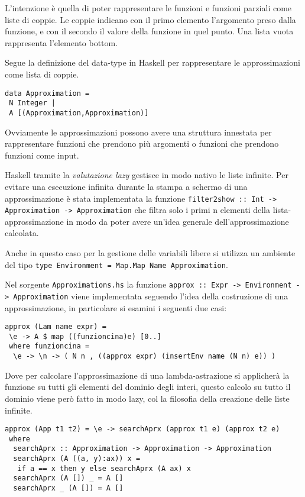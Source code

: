 \documentclass{article}
\begin{document}
L'intenzione è quella di poter rappresentare le funzioni e funzioni parziali come liste di coppie. Le coppie indicano con il primo elemento l'argomento preso dalla funzione, e con il secondo il valore della funzione in quel punto. Una lista vuota rappresenta l'elemento bottom.

Segue la definizione del data-type in Haskell per rappresentare le approssimazioni come lista di coppie.

\begin{verbatim}
data Approximation = 
 N Integer |
 A [(Approximation,Approximation)]
\end{verbatim}

Ovviamente le approssimazioni possono avere una struttura innestata per rappresentare funzioni che prendono più argomenti o funzioni che prendono funzioni come input.

Haskell tramite la \emph{valutazione lazy} gestisce in modo nativo le liste infinite.
Per evitare una esecuzione infinita durante la stampa a schermo di una approssimazione è stata implementata la funzione \texttt{filter2show :: Int -> Approximation -> Approximation} che filtra solo i primi n elementi della lista-approssimazione in modo da poter avere un'idea generale dell'approssimazione calcolata.

Anche in questo caso per la gestione delle variabili libere si utilizza un ambiente del tipo \texttt{type Environment = Map.Map Name Approximation}.

Nel sorgente \texttt{Approximations.hs} la funzione \texttt{approx :: Expr -> Environment -> Approximation} viene implementata seguendo l'idea della costruzione di una approssimazione, in particolare si esamini i seguenti due casi:

\begin{verbatim}
approx (Lam name expr) = 
 \e -> A $ map ((funzioncina)e) [0..]
 where funzioncina = 
  \e -> \n -> ( N n , ((approx expr) (insertEnv name (N n) e)) )
\end{verbatim}

Dove per calcolare l'approssimazione di una lambda-astrazione si applicherà la funzione su tutti gli elementi del dominio degli interi, questo calcolo su tutto il dominio viene però fatto in modo lazy, col la filosofia della creazione delle liste infinite.

\begin{verbatim}
approx (App t1 t2) = \e -> searchAprx (approx t1 e) (approx t2 e)
 where
  searchAprx :: Approximation -> Approximation -> Approximation
  searchAprx (A ((a, y):ax)) x =
   if a == x then y else searchAprx (A ax) x
  searchAprx (A []) _ = A []
  searchAprx _ (A []) = A []
\end{verbatim}
\end{document}
